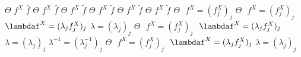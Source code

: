 $\Theta$%
\stopmpxshipout
\mpxshipout%
$f^{X}$%
\stopmpxshipout
\mpxshipout%
$\widehat{f}$%
\stopmpxshipout
\mpxshipout%
$\Theta$%
\stopmpxshipout
\mpxshipout%
$f^{X}$%
\stopmpxshipout
\mpxshipout%
$\widehat{f}$%
\stopmpxshipout
\mpxshipout%
$\Theta$%
\stopmpxshipout
\mpxshipout%
$f^{X}$%
\stopmpxshipout
\mpxshipout%
$\widetilde{f}$%
\stopmpxshipout
\mpxshipout%
$\Theta$%
\stopmpxshipout
\mpxshipout%
$f^{X}$%
\stopmpxshipout
\mpxshipout%
$\widetilde{f}$%
\stopmpxshipout
\mpxshipout%
$\Theta$%
\stopmpxshipout
\mpxshipout%
$f^{X}$%
\stopmpxshipout
\mpxshipout%
$\widetilde{f}$%
\stopmpxshipout
\mpxshipout%
$\Theta$%
\stopmpxshipout
\mpxshipout%
$f^{X}$%
\stopmpxshipout
\mpxshipout%
$\widetilde{f}$%
\stopmpxshipout
\mpxshipout%
$\Theta$%
\stopmpxshipout
\mpxshipout%
$ $%
\stopmpxshipout
\mpxshipout%
$f^{X}=(f^{X}_j)_j$%
\stopmpxshipout
\mpxshipout%
$\Theta$%
\stopmpxshipout
\mpxshipout%
$ $%
\stopmpxshipout
\mpxshipout%
$f^{X}=(f^{X}_j)_j$%
\stopmpxshipout
\mpxshipout%
$ $%
\stopmpxshipout
\mpxshipout%
$\lambdaf^{X}=(\lambda_jf^{X}_j)_j$%
\stopmpxshipout
\mpxshipout%
$\lambda=(\lambda_j)_j$%
\stopmpxshipout
\mpxshipout%
$\Theta$%
\stopmpxshipout
\mpxshipout%
$ $%
\stopmpxshipout
\mpxshipout%
$f^{X}=(f^{X}_j)_j$%
\stopmpxshipout
\mpxshipout%
$ $%
\stopmpxshipout
\mpxshipout%
$\lambdaf^{X}=(\lambda_jf^{X}_j)_j$%
\stopmpxshipout
\mpxshipout%
$\lambda=(\lambda_j)_j$%
\stopmpxshipout
\mpxshipout%
$\lambda^{-1}=(\lambda^{-1}_j)_j$%
\stopmpxshipout
\mpxshipout%
$\Theta$%
\stopmpxshipout
\mpxshipout%
$ $%
\stopmpxshipout
\mpxshipout%
$f^{X}=(f^{X}_j)_j$%
\stopmpxshipout
\mpxshipout%
$ $%
\stopmpxshipout
\mpxshipout%
$\lambdaf^{X}=(\lambda_jf^{X}_j)_j$%
\stopmpxshipout
\mpxshipout%
$\lambda=(\lambda_j)_j$%
